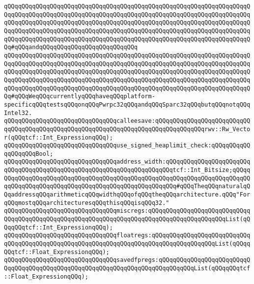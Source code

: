 \verb|qQQqqQQqqQQqqQQqqQQqqQQqqQQqqQQqqQQqqQQqqQQqqQQqqQQqqQQqqQQqqQQqqQQqqQQqqQQqqQQqqQQqqQQqqQQqqQQqqQQqqQQqqQQqqQQqqQQqqQQqqQQqqQQqqQQqqQQqqQQqqQQqqQQqqQQqqQQqqQQqqQQqqQQqqQQqqQQqqQQqqQQqqQQqqQQqqQQqqQQqqQQqqQQqqQQqqQQqqQQqqQQqqQQqqQQqqQQqqQQqqQQqqQQqqQQqqQQqqQQqqQQqqQQqqQQqqQQqqQQqqQQqqQQqqQQqqQQqqQQqqQQqqQQqqQQqqQQqqQQqqQQqqQQqqQQqqQQqqQQqqQQqqQQqqQQq#qQQqandqQQqqQQqqQQqqQQqqQQqqQQqqQQq|\newline
\verb|qQQqqQQqqQQqqQQqqQQqqQQqqQQqqQQqqQQqqQQqqQQqqQQqqQQqqQQqqQQqqQQqqQQqqQQqqQQqqQQqqQQqqQQqqQQqqQQqqQQqqQQqqQQqqQQqqQQqqQQqqQQqqQQqqQQqqQQqqQQqqQQqqQQqqQQqqQQqqQQqqQQqqQQqqQQqqQQqqQQqqQQqqQQqqQQqqQQqqQQqqQQqqQQqqQQqqQQqqQQqqQQqqQQqqQQqqQQqqQQqqQQqqQQqqQQqqQQqqQQqqQQqqQQqqQQqqQQqqQQqqQQqqQQqqQQqqQQqqQQqqQQqqQQqqQQqqQQqqQQqqQQqqQQqqQQqqQQqqQQqqQQqqQQqqQQq#qQQqWeqQQqcurrentlyqQQqhaveqQQqplatform-specificqQQqtestsqQQqonqQQqPwrpc32qQQqandqQQqSparc32qQQqbutqQQqnotqQQqIntel32.|\newline
\verb|qQQqqQQqqQQqqQQqqQQqqQQqqQQqqQQqcalleesave:qQQqqQQqqQQqqQQqqQQqqQQqqQQqqQQqqQQqqQQqqQQqqQQqqQQqqQQqqQQqqQQqqQQqqQQqqQQqqQQqqQQqrwv::Rw_Vector(qQQqtcf::Int_ExpressionqQQq);|\newline
\verb|qQQqqQQqqQQqqQQqqQQqqQQqqQQqqQQquse_signed_heaplimit_check:qQQqqQQqqQQqqQQqqQQqBool;|\newline
\verb|qQQqqQQqqQQqqQQqqQQqqQQqqQQqqQQqaddress_width:qQQqqQQqqQQqqQQqqQQqqQQqqQQqqQQqqQQqqQQqqQQqqQQqqQQqqQQqqQQqqQQqqQQqqQQqtcf::Int_Bitsize;qQQqqQQqqQQqqQQqqQQqqQQqqQQqqQQqqQQqqQQqqQQqqQQqqQQqqQQqqQQqqQQqqQQqqQQqqQQqqQQqqQQqqQQqqQQqqQQqqQQqqQQqqQQqqQQqqQQqqQQqqQQq#qQQqTheqQQqnaturalqQQqaddressqQQqarithmeticqQQqwidthqQQqofqQQqtheqQQqarchitecture.qQQq"ForqQQqmostqQQqarchitecturesqQQqthisqQQqisqQQq32."|\newline
\newline
\verb|qQQqqQQqqQQqqQQqqQQqqQQqqQQqqQQqmiscregs:qQQqqQQqqQQqqQQqqQQqqQQqqQQqqQQqqQQqqQQqqQQqqQQqqQQqqQQqqQQqqQQqqQQqqQQqqQQqqQQqqQQqqQQqqQQqList(qQQqqQQqtcf::Int_ExpressionqQQq);|\newline
\verb|qQQqqQQqqQQqqQQqqQQqqQQqqQQqqQQqfloatregs:qQQqqQQqqQQqqQQqqQQqqQQqqQQqqQQqqQQqqQQqqQQqqQQqqQQqqQQqqQQqqQQqqQQqqQQqqQQqqQQqqQQqqQQqList(qQQqqQQqtcf::Float_ExpressionqQQq);|\newline
\verb|qQQqqQQqqQQqqQQqqQQqqQQqqQQqqQQqsavedfpregs:qQQqqQQqqQQqqQQqqQQqqQQqqQQqqQQqqQQqqQQqqQQqqQQqqQQqqQQqqQQqqQQqqQQqqQQqqQQqqQQqList(qQQqqQQqtcf::Float_ExpressionqQQq);|\newline
